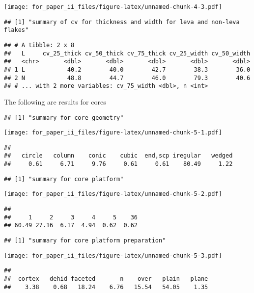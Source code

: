 \documentclass[]{article}
\begin{document}
\texttt{[image: for\_paper\_ii\_files/figure-latex/unnamed-chunk-4-3.pdf]}

\begin{verbatim}
## [1] "summary of cv for thickness and width for leva and non-leva flakes"
\end{verbatim}

\begin{verbatim}
## # A tibble: 2 x 8
##   L     cv_25_thick cv_50_thick cv_75_thick cv_25_width cv_50_width
##   <chr>       <dbl>       <dbl>       <dbl>       <dbl>       <dbl>
## 1 L            40.2        40.0        42.7        38.3        36.0
## 2 N            48.8        44.7        46.0        79.3        40.6
## # ... with 2 more variables: cv_75_width <dbl>, n <int>
\end{verbatim}

The following are results for cores

\begin{verbatim}
## [1] "summary for core geometry"
\end{verbatim}

\texttt{[image: for\_paper\_ii\_files/figure-latex/unnamed-chunk-5-1.pdf]}

\begin{verbatim}
## 
##   circle   column    conic    cubic  end,scp iregular   wedged 
##     0.61     6.71     9.76     0.61     0.61    80.49     1.22
\end{verbatim}

\begin{verbatim}
## [1] "summary for core platform"
\end{verbatim}

\texttt{[image: for\_paper\_ii\_files/figure-latex/unnamed-chunk-5-2.pdf]}

\begin{verbatim}
## 
##     1     2     3     4     5    36 
## 60.49 27.16  6.17  4.94  0.62  0.62
\end{verbatim}

\begin{verbatim}
## [1] "summary for core platform preparation"
\end{verbatim}

\texttt{[image: for\_paper\_ii\_files/figure-latex/unnamed-chunk-5-3.pdf]}

\begin{verbatim}
## 
##  cortex   dehid faceted       n    over   plain   plane 
##    3.38    0.68   18.24    6.76   15.54   54.05    1.35
\end{verbatim}
\end{document}
